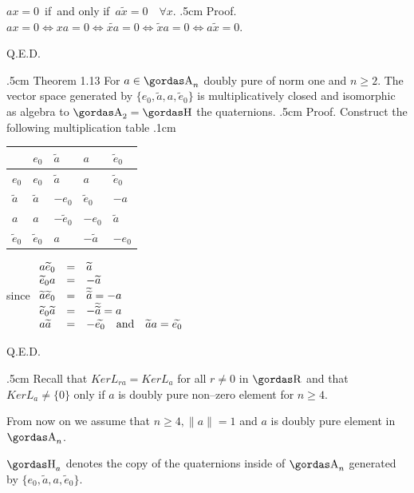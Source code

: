 $ax=0\,$ if\, and only
if $\,a\widetilde{x}=0\quad\forall x$.
\vglue.5cm
\noindent
{\bsbf Proof.} $ax=0\Leftrightarrow xa=0\Leftrightarrow \widetilde{xa}
=0 \Leftrightarrow \widetilde{x}a=0\Leftrightarrow a\widetilde{x}=0$.
\begin{flushright}
Q.E.D.
\end{flushright}
\vglue.5cm
\noindent
{\bsbf Theorem 1.13} For $a\in \a_{n}$ doubly pure of norm one and $n\ge 2$.
The vector space generated by $\{e_{0},\widetilde{a},a,\widetilde{e}_{0}\}$ is
multiplicatively closed and isomorphic as algebra
to $\a_{2}=\ache$ the
quaternions.
\vglue.5cm
\noindent
{\bsbf Proof.} Construct the following multiplication table
\vglue.1cm
\begin{center}
\begin{tabular}{l|llll}
&$e_{0}$&$\widetilde{a}$&$a$&$\widetilde{e}_{0}$\\ \hline
$e_{0}$&$e_{0}$&$\widetilde{a}$&$a$&$\widetilde{e}_{0}$\\
$\widetilde{a}$&$\widetilde{a}$&$-e_{0}$&$\widetilde{e}_{0}$&$-a$\\              
$a$&$a$&$-\widetilde{e}_{0}$&$-e_{0}$&$\widetilde{a}$\\
$\widetilde{e}_{0}$&$\widetilde{e}_{0}$&$a$&$-\widetilde{a}$&$-e_{0}$
\end{tabular}
since
$
\begin{array}{lll}
a\widetilde{e}_{0}&=&\widetilde{a}\\
\widetilde{e}_{0}a&=&-\widetilde{a}\\
\widetilde{a}\widetilde{e}_{0}&=&\widetilde{\widetilde{a}}=-a\\
\widetilde{e}_{0}\widetilde{a}&=&-\widetilde{\widetilde{a}}=a\\
a\widetilde{a}&=&-\widetilde{e_{0}}\quad\hbox{\rm and}\quad
\widetilde{a}a=\widetilde{e_{0}}
\end{array}
$
\end{center}
\begin{flushright}
Q.E.D.
\end{flushright}
\vglue.5cm
\noindent
Recall that $Ker L_{ra}= Ker L_{a}$ for all $r\neq 0$ in $\erre$ and that 
$Ker L_{a}\neq \{0\}$ only if $a$ is doubly pure non--zero element for
$n\ge 4$.
\par 
{\bsit From now on we assume that $n\ge 4, \parallel a\parallel=1$ and
$a$ is doubly pure element in $\a_{n}$.}
\par 
$\ache_{a}$ denotes the copy of the quaternions inside of $\a_{n}$ generated
by $\{e_{0},\widetilde{a},a,\widetilde{e}_{0}\}$.
